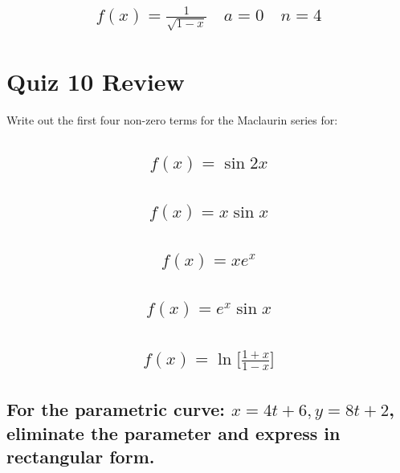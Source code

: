\documentclass{article}
\begin{document}
\subsection{
	\begin{align*}
		f(x) = \frac{1}{\sqrt{1 - x}} \quad a = 0 \quad n = 4
	\end{align*}
}







\newpage
\section{Quiz 10 Review}
Write out the first four non-zero terms for the Maclaurin series for:
\subsection{
	\begin{align*}
		f(x) = \sin{2x}
	\end{align*}
}

\subsection{
	\begin{align*}
		f(x) = x\sin{x}
	\end{align*}
}

\subsection{
	\begin{align*}
		f(x) = xe^x
	\end{align*}
}

\subsection{
	\begin{align*}
		f(x) = e^x \sin{x}
	\end{align*}
}

\subsection{
	\begin{align*}
		f(x) = \ln{\bigg[ \frac{1 + x}{1 - x} \bigg]}
	\end{align*}
}

\subsection{For the parametric curve: $x = 4t + 6, y = 8t + 2$, eliminate the parameter and express in rectangular form.}
\end{document}
